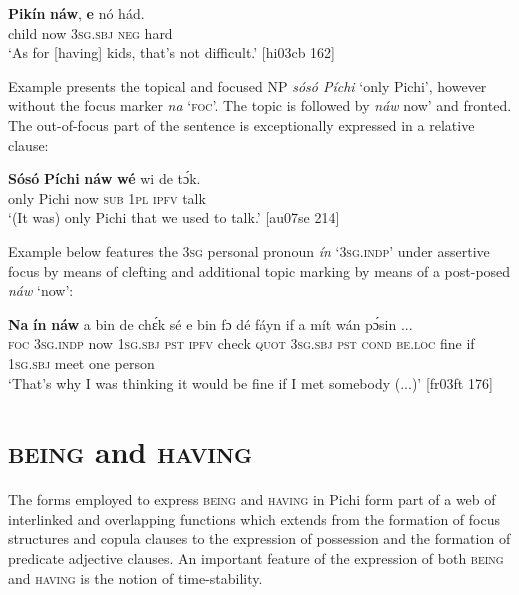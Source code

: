 \ea%
    \label{ex:key:758}
    \gll \textbf{Pikín}  \textbf{náw},  \textbf{e}  nó  hád.\\
child  now  \textsc{3sg.sbj}  \textsc{neg}  hard\\

\glt ‘As for [having] kids, that’s not difficult.’ [hi03cb 162]
\z

Example  presents the topical and focused \textsc{NP} \textit{sósó Píchi} ‘only Pichi’, however without the focus marker \textit{na} ‘\textsc{foc}’. The topic is followed by \textit{náw} now’ and fronted. The out-of-focus part of the sentence is exceptionally expressed in a relative clause: 


\ea%
    \label{ex:key:759}
    \gll \textbf{Sósó}  \textbf{Píchi}  \textbf{náw}    \textbf{wé}  wi  de  tɔ́k.\\
only    Pichi  now    \textsc{sub}  \textsc{1pl}  \textsc{ipfv}  talk\\

\glt ‘(It was) only Pichi that we used to talk.’ [au07se 214]
\z

Example  below features the \textsc{3sg} personal pronoun \textit{ín} ‘\textsc{3sg.indp}’ under assertive focus by means of clefting and additional topic marking by means of a post-posed \textit{náw} ‘now’:


\ea%
    \label{ex:key:760}
    \gll \textbf{Na}  \textbf{ín}    \textbf{náw}    a    bin  de  chɛ́k  sé    e    bin  fɔ 
dé    fáyn    if  a    mít    wán    pɔ́sin  \op...\cp{}\\
\textsc{foc}  \textsc{3sg.indp}  now    \textsc{1sg.sbj}  \textsc{pst}  \textsc{ipfv}  check  \textsc{quot}    \textsc{3sg.sbj}  \textsc{pst}  \textsc{cond} 
\textsc{be.loc}  fine    if  \textsc{1sg.sbj}  meet  one    person\\

\glt ‘That’s why I was thinking it would be fine if I met somebody (...)’ [fr03ft 176]
\z

\section{\textsc{being} and \textsc{having}}\label{sec:7.6}

The forms employed to express \textsc{being} and \textsc{having} in Pichi form part of a web of interlinked and overlapping functions which extends from the formation of focus structures and copula clauses to the expression of possession and the formation of predicate adjective clauses. An important feature of the expression of both \textsc{being} and \textsc{having} is the notion of time-stability.

